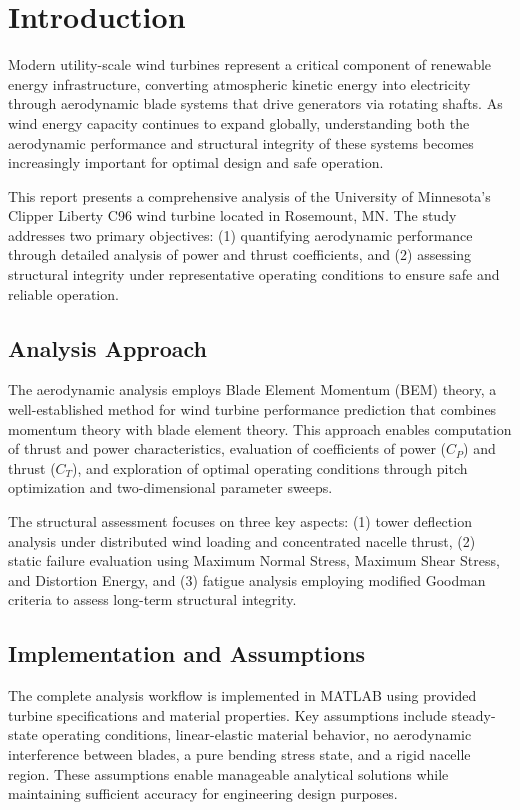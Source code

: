 \documentclass[11pt]{article}
\begin{document}
\tableofcontents
\newpage

\section{Introduction}

Modern utility-scale wind turbines represent a critical component of renewable energy infrastructure, converting atmospheric kinetic energy into electricity through aerodynamic blade systems that drive generators via rotating shafts. As wind energy capacity continues to expand globally, understanding both the aerodynamic performance and structural integrity of these systems becomes increasingly important for optimal design and safe operation.

This report presents a comprehensive analysis of the University of Minnesota's Clipper Liberty C96 wind turbine located in Rosemount, MN. The study addresses two primary objectives: (1) quantifying aerodynamic performance through detailed analysis of power and thrust coefficients, and (2) assessing structural integrity under representative operating conditions to ensure safe and reliable operation.

\subsection{Analysis Approach}

The aerodynamic analysis employs Blade Element Momentum (BEM) theory, a well-established method for wind turbine performance prediction that combines momentum theory with blade element theory. This approach enables computation of thrust and power characteristics, evaluation of coefficients of power ($C_P$) and thrust ($C_T$), and exploration of optimal operating conditions through pitch optimization and two-dimensional parameter sweeps.

The structural assessment focuses on three key aspects: (1) tower deflection analysis under distributed wind loading and concentrated nacelle thrust, (2) static failure evaluation using Maximum Normal Stress, Maximum Shear Stress, and Distortion Energy, and (3) fatigue analysis employing modified Goodman criteria to assess long-term structural integrity.

\subsection{Implementation and Assumptions}

The complete analysis workflow is implemented in MATLAB using provided turbine specifications and material properties. Key assumptions include steady-state operating conditions, linear-elastic material behavior, no aerodynamic interference between blades, a pure bending stress state, and a rigid nacelle region. These assumptions enable manageable analytical solutions while maintaining sufficient accuracy for engineering design purposes.
\end{document}
